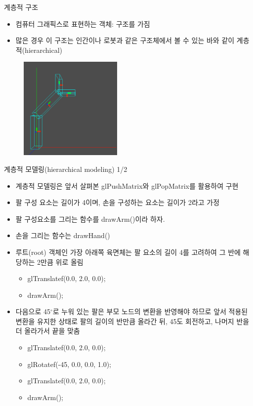 \documentclass{beamer}
\begin{document}
\begin{frame}[fragile]{계층적 구조}

\begin{itemize}
\item 컴퓨터 그래픽스로 표현하는 객체: 구조를 가짐
\item 많은 경우 이 구조는 인간이나 로봇과 같은 구조체에서 볼 수 있는 바와 같이 계층적(hierarchical) 
\end{itemize}

\begin{figure}
    \includegraphics[height=5cm]{OGL_transform/robotArm.png}
\end{figure}

\end{frame}

\begin{frame}[fragile]{계층적 모델링(hierarchical modeling) 1/2}

\begin{itemize}
\item 계층적 모델링은 앞서 살펴본 {\sf glPushMatrix}와 {\sf glPopMatrix}를 활용하여 구현
\item 팔 구성 요소는 길이가 4이며, 손을 구성하는 요소는 길이가 2라고 가정
\item 팔 구성요소를 그리는 함수를 {\sf drawArm()}이라 하자.
\item 손을 그리는 함수는 {\sf drawHand()}
\item 루트(root) 객체인 가장 아래쪽 육면체는 팔 요소의 길이 4를 고려하여 그 반에 해당하는 2만큼 위로 올림
	\begin{itemize}
	\item glTranslatef(0.0, 2.0, 0.0);
	\item drawArm();
	\end{itemize}
\item 다음으로 45$^{\circ}$로 누워 있는 팔은 부모 노드의 변환을 반영해야 하므로 앞서 적용된 변환을 유지한 상태로 팔의 길이의 반만큼 올라간 뒤, 45도 회전하고, 나머지 반을 더 올라가서 끝을 맞춤
	\begin{itemize}
	\item glTranslatef(0.0, 2.0, 0.0);
	\item glRotatef(-45, 0.0, 0.0, 1.0);
	\item glTranslatef(0.0, 2.0, 0.0);
	\item drawArm();
	\end{itemize}
\end{itemize}
\end{frame}
\end{document}
